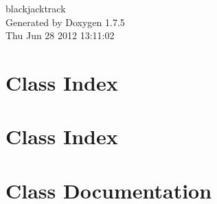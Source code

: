 \documentclass[a4paper]{book}
\begin{document}
\hypersetup{pageanchor=false,citecolor=blue}
\begin{titlepage}
\vspace*{7cm}
\begin{center}
{\Large blackjacktrack }\\
\vspace*{1cm}
{\large \-Generated by Doxygen 1.7.5}\\
\vspace*{0.5cm}
{\small Thu Jun 28 2012 13:11:02}\\
\end{center}
\end{titlepage}
\clearemptydoublepage
{}
\tableofcontents
\clearemptydoublepage
{}
\hypersetup{pageanchor=true,citecolor=blue}
\chapter{\-Class \-Index}

\chapter{\-Class \-Index}

\chapter{\-Class \-Documentation}




































\printindex
\end{document}
